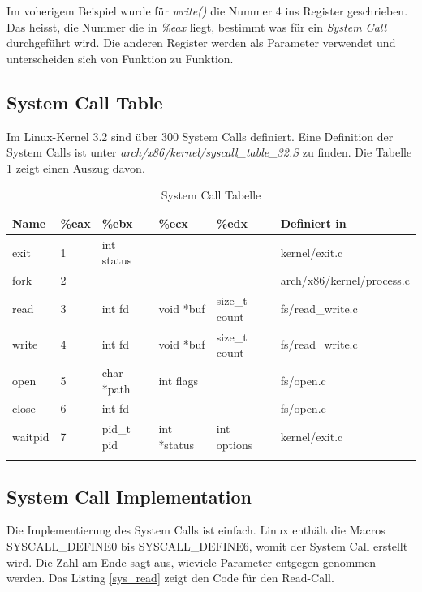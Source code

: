 Im voherigem Beispiel wurde für \emph{write()} die Nummer 4 ins Register geschrieben. Das heisst, die Nummer die in \emph{\%eax} liegt, bestimmt was für ein \emph{System Call} durchgeführt
wird. Die anderen Register werden als Parameter verwendet und unterscheiden sich von Funktion zu Funktion.

\subsection{System Call Table}

Im Linux-Kernel 3.2 sind über 300 System Calls definiert. Eine Definition der 
System Calls ist unter \emph{arch/x86/kernel/syscall\_table\_32.S} zu finden. Die Tabelle \ref{tab:x86_syscall} zeigt einen Auszug davon.

\begin{longtable}{| l | l | l | l | l | l |} \hline
   \textbf{Name} & \textbf{\%eax} & \textbf{\%ebx} & \textbf{\%ecx} & \textbf{\%edx} & \textbf{Definiert in}    \\ \hline
   exit          & 1              & int status     &                &                & kernel/exit.c     \\ \hline
   fork          & 2              &                &                &                & arch/x86/kernel/process.c \\ \hline
   read          & 3              & int fd         & void *buf      & size\_t count  & fs/read\_write.c  \\ \hline
   write         & 4              & int fd         & void *buf      & size\_t count  & fs/read\_write.c  \\ \hline
   open          & 5              & char *path     & int flags      &                & fs/open.c         \\ \hline
   close         & 6              & int fd         &                &                & fs/open.c         \\ \hline
   waitpid       & 7              & pid\_t pid     & int *status    & int options    & kernel/exit.c     \\ \hline
   \caption{System Call Tabelle}
   \label{tab:x86_syscall}
\end{longtable}


\subsection{System Call Implementation}

Die Implementierung des System Calls ist einfach. Linux enthält die Macros SYSCALL\_DEFINE0 bis
SYSCALL\_DEFINE6, womit der System Call erstellt wird. Die Zahl am Ende sagt aus, wieviele Parameter
entgegen genommen werden. Das Listing \ref{sys_read} zeigt den Code für den Read-Call.

